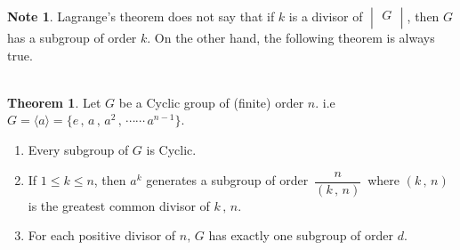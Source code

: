 \documentclass[11pt,a4paper]{article}
\theoremstyle{definition}
\newtheorem{thm}{Theorem}[subsection]
\newtheorem*{note}{Note}
\begin{document}
\begin{note}
Lagrange's theorem does not say that if $k$ is a divisor of $\begin{vmatrix}
G\\
\end{vmatrix}$, then $G$ has a subgroup of order $k$. On the other hand, the following theorem is always true.\\\\
\end{note}





\begin{thm}
Let $G$ be a Cyclic group of (finite) order $n$. i.e $G = \langle a\rangle = \{e\, , \, a\, , \, a^2\, , \, \cdots\cdots\, a^{n-1}\}$.
\begin{enumerate}
\item[(i)] Every subgroup of $G$ is Cyclic.
\item[(ii)] If $1\leq k\leq n$, then $a^k$ generates a subgroup of order $\, \dfrac{n}{(k\, ,\, n)}\,$ where $(k\,,\, n)$ is the greatest common divisor of $k\,, \, n$.
\item[(iii)] For each positive divisor of $n,\, G$ has exactly one subgroup of order $d$.\\\\
\end{enumerate}
\end{thm}
\end{document}
